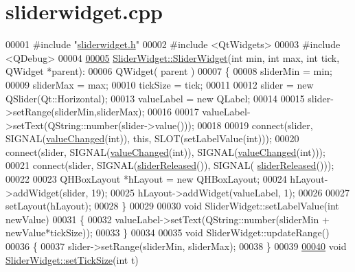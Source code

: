 \hypertarget{sliderwidget_8cpp_source}{}\section{sliderwidget.\+cpp}
\label{sliderwidget_8cpp_source}

\begin{DoxyCode}
00001 \textcolor{preprocessor}{#include "\hyperlink{sliderwidget_8h}{sliderwidget.h}"}
00002 \textcolor{preprocessor}{#include <QtWidgets>}
00003 \textcolor{preprocessor}{#include <QDebug>}
00004 
\hypertarget{sliderwidget_8cpp_source.tex_l00005}{}\hyperlink{classSliderWidget_a22d7be7e513e8d74ec95fcc73d96fdf6}{00005} \hyperlink{classSliderWidget_a22d7be7e513e8d74ec95fcc73d96fdf6}{SliderWidget::SliderWidget}(\textcolor{keywordtype}{int} min, \textcolor{keywordtype}{int} max, \textcolor{keywordtype}{int} tick, QWidget *parent):
00006     QWidget( parent )
00007 \{
00008     sliderMin = min;
00009     sliderMax = max;
00010     tickSize = tick;
00011 
00012     slider = \textcolor{keyword}{new} QSlider(Qt::Horizontal);
00013     valueLabel = \textcolor{keyword}{new} QLabel;
00014 
00015     slider->setRange(sliderMin,sliderMax);
00016 
00017     valueLabel->setText(QString::number(slider->value()));
00018 
00019     connect(slider, SIGNAL(\hyperlink{classSliderWidget_a23048ce6bec593c2b4d932293b055fa7}{valueChanged}(\textcolor{keywordtype}{int})), \textcolor{keyword}{this}, SLOT(setLabelValue(\textcolor{keywordtype}{int})));
00020     connect(slider, SIGNAL(\hyperlink{classSliderWidget_a23048ce6bec593c2b4d932293b055fa7}{valueChanged}(\textcolor{keywordtype}{int})), SIGNAL(\hyperlink{classSliderWidget_a23048ce6bec593c2b4d932293b055fa7}{valueChanged}(\textcolor{keywordtype}{int})));
00021     connect(slider, SIGNAL(\hyperlink{classSliderWidget_aa109c6305bc6e78efe3091982e787325}{sliderReleased}()), SIGNAL(
      \hyperlink{classSliderWidget_aa109c6305bc6e78efe3091982e787325}{sliderReleased}()));
00022 
00023     QHBoxLayout *hLayout = \textcolor{keyword}{new} QHBoxLayout;
00024     hLayout->addWidget(slider, 19);
00025     hLayout->addWidget(valueLabel, 1);
00026 
00027     setLayout(hLayout);
00028 \}
00029 
00030 \textcolor{keywordtype}{void} SliderWidget::setLabelValue(\textcolor{keywordtype}{int} newValue)
00031 \{
00032     valueLabel->setText(QString::number(sliderMin + newValue*tickSize));
00033 \}
00034 
00035 \textcolor{keywordtype}{void} SliderWidget::updateRange()
00036 \{
00037     slider->setRange(sliderMin, sliderMax);
00038 \}
00039 
\hypertarget{sliderwidget_8cpp_source.tex_l00040}{}\hyperlink{classSliderWidget_a8d5fb2c86d6dbcbe67ae480590020af6}{00040} \textcolor{keywordtype}{void} \hyperlink{classSliderWidget_a8d5fb2c86d6dbcbe67ae480590020af6}{SliderWidget::setTickSize}(\textcolor{keywordtype}{int} t)

\end{DoxyCode}
